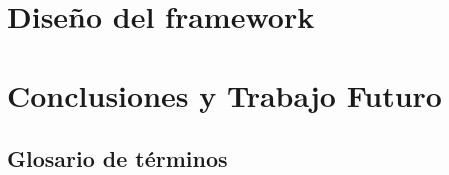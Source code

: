 \documentclass[12pt,spanish]{book}
\begin{document}



\chapter{Diseño del framework}\label{cap:Diseño}


\chapter{Conclusiones y Trabajo Futuro}




\appendixpage
{}
\begin{appendices}
\section{Glosario de términos}

\end{appendices}






\end{document}
